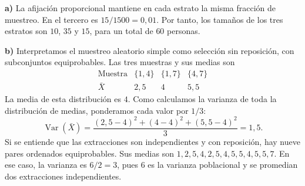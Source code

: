 \textbf{a)} La afijación proporcional mantiene en cada estrato la misma fracción de muestreo. En el tercero es $15/1500=0{,}01$. Por tanto, los tamaños de los tres estratos son $10$, $35$ y $15$, para un total de $\boxed{60}$ personas.

\textbf{b)} Interpretamos el muestreo aleatorio simple como selección sin reposición, con subconjuntos equiprobables. Las tres muestras y sus medias son
\[
\begin{array}{c|ccc}
\text{Muestra}&\{1,4\}&\{1,7\}&\{4,7\}\\\hline
\bar X&2{,}5&4&5{,}5
\end{array}
\]
La media de esta distribución es $4$. Como calculamos la varianza de toda la distribución de medias, ponderamos cada valor por $1/3$:
\[
\operatorname{Var}(\bar X)=
\frac{(2{,}5-4)^2+(4-4)^2+(5{,}5-4)^2}{3}
=\boxed{1{,}5}.
\]
Si se entiende que las extracciones son independientes y con reposición, hay nueve pares ordenados equiprobables. Sus medias son $1,2{,}5,4,2{,}5,4,5{,}5,4,5{,}5,7$. En ese caso, la varianza es $6/2=3$, pues $6$ es la varianza poblacional y se promedian dos extracciones independientes.
